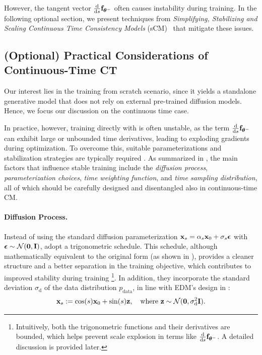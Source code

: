 However, the tangent vector 
$\tfrac{\mathop{}\!\mathrm{d} }{\mathop{}\!\mathrm{d} s}{\mathbf{f}}_{\bm{\theta}^-}$ 
often causes instability during training. 
In the following optional section, we present techniques from 
\emph{Simplifying, Stabilizing and Scaling Continuous Time Consistency Models} 
(sCM)~\citep{lu2024simplifying} that mitigate these issues.





\subsection{(Optional) Practical Considerations of Continuous-Time CT} 
Our interest lies in the training from scratch scenario, since it yields a
standalone generative model that does not rely on external pre-trained diffusion
models. Hence, we focus our discussion on the continuous time case.

In practice, however, training directly with  is often unstable, 
as the term $\tfrac{\mathop{}\!\mathrm{d}}{\mathop{}\!\mathrm{d} s}{\mathbf{f}}_{\bm{\theta}^-}$ can exhibit large or unbounded time derivatives, 
leading to exploding gradients during optimization. To overcome this, suitable
parameterizations and stabilization strategies are typically required
\citep{geng2025consistency,lu2024simplifying}. As summarized in
, the main factors that influence stable
training include the \emph{diffusion process}, \emph{parameterization choices},
\emph{time weighting function}, and \emph{time sampling distribution}, all of
which should be carefully designed and disentangled also in continuous-time CM.




\paragraph{Diffusion Process.}  Instead of using the standard diffusion parameterization 
${\mathbf{x}}_s = \alpha_s {\mathbf{x}}_0 + \sigma_s \bm{\epsilon}$ with 
$\bm{\epsilon} \sim \mathcal{N}(\bm{0}, {\mathbf{I}})$, 
\citet{lu2024simplifying} adopt a trigonometric schedule. 
This schedule, although mathematically equivalent to the original form 
(as shown in ), provides a cleaner structure and a better 
separation in the training objective, which contributes to improved stability 
during training
\footnote{Intuitively, both the trigonometric functions and their derivatives are bounded, which helps prevent scale explosion in terms like $\frac{\mathop{}\!\mathrm{d}}{\mathop{}\!\mathrm{d} s} {\mathbf{f}}_{\bm{\theta}^-}$. A detailed discussion is provided later.
}. In addition, they incorporate the standard deviation $\sigma_{\mathrm{d}}$ of the data distribution $p_{\mathrm{data}}$, in line with EDM’s design in :
\begin{align}\label{eq:trig-scm}
    {\mathbf{x}}_s := \cos(s) {\mathbf{x}}_0 + \sin(s) {\mathbf{z}}, \quad \text{where } {\mathbf{z}} \sim \mathcal{N}(\bm{0}, \sigma_{\mathrm{d}}^2 {\mathbf{I}}).
\end{align}

